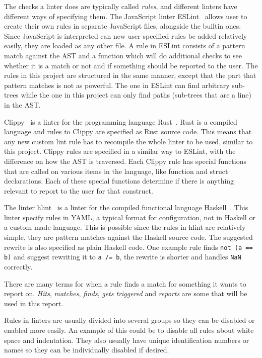 \documentclass[a4paper,12pt]{article}
\begin{document}
The checks a linter does are typically called \emph{rules}, and different linters have
different ways of specifying them. The JavaScript linter ESLint~\cite{ESLint} allows user
to create their own rules in separate JavaScript files, alongside the builtin ones.
Since JavaScript is interpreted can new user-specified rules be added relatively easily,
they are loaded as any other file.
A rule in ESLint
consists of a pattern match against the AST and a function
which will do additional checks to see whether it is a match or not and if something
should be reported to the user. The rules in this project are structured in the same
manner, except that the part that pattern matches is not as powerful. The one in ESLint can
find arbitrary sub-trees while the one in this project can only find paths (sub-trees that
are a line) in the AST.

Clippy~\cite{Clippy} is a linter for the programming language Rust~\cite{rustlang}. Rust
is a compiled language and rules to Clippy are specified as Rust source code. This means
that any new custom lint rule has to recompile the whole linter to be used, similar to
this project. Clippy rules are specified in a similar way to ESLint, with the difference
on how the AST is traversed. Each Clippy rule has special functions that are called on
various items in the language, like function and struct declarations. Each of these
special functions determine if there is anything relevant to report to the user for that
construct.

The linter hlint~\cite{hlint} is a linter for the compiled functional language
Haskell~\cite{haskell}. This linter specify rules in YAML, a typical format for
configuration, not in Haskell or a custom made language. This is possible since
the rules in hlint are relatively simple, they are pattern matches against the Haskell source code.
The suggested rewrite is also specified as plain Haskell code. One example rule finds \texttt{not (a == b)}
and suggest rewriting it to \texttt{a /= b}, the rewrite is shorter and handles \texttt{NaN} correctly.

There are many terms for when a rule finds a match for something it wants to report on.
\emph{Hits}, \emph{matches}, \emph{finds}, \emph{gets triggered} and \emph{reports} are
some that will be used in this report.

Rules in linters are usually divided into several groups so they can be disabled or
enabled more easily. An example of this could be to disable all rules about white space
and indentation. They also usually have unique identification numbers or names so they can
be individually disabled if desired.
\end{document}
